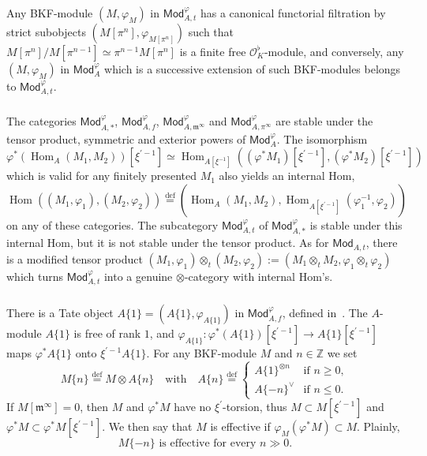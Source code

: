 \documentclass[11pt]{article}
\theoremstyle{definition}
\numberwithin{equation}{section}
\numberwithin{figure}{section}
\numberwithin{table}{section}
\newcommand{\Mod}{\mathsf{Mod}}
\DeclareMathOperator{\Hom}{Hom}
\newcommand{\eqd}{\stackrel{\mathrm{def}}{=}}
\begin{document}
\subsubsection{}

Any BKF-module $(M,\varphi_{M})$ in $\Mod_{A,t}^{\varphi}$ has a canonical functorial filtration by strict subobjects $(M[\pi^{n}],\varphi_{M[\pi^{n}]})$ such that $M[\pi^{n}]/M[\pi^{n-1}]\simeq\pi^{n-1}M[\pi^{n}]$ is a finite free $\mathcal{O}_{K}^{\flat}$-module, and conversely, any $(M,\varphi_{M})$ in $\Mod_{A}^{\varphi}$ which is a successive extension of such BKF-modules belongs to $\Mod_{A,t}^{\varphi}$.

\subsubsection{}

The categories $\Mod_{A,\ast}^{\varphi}$, $\Mod_{A,f}^{\varphi}$, $\Mod_{A,\mathfrak{m}^{\infty}}^{\varphi}$ and $\Mod_{A,\pi^{\infty}}^{\varphi}$ are stable under the tensor product, symmetric and exterior powers of $\Mod_{A}^{\varphi}$. The isomorphism
\[
\varphi^{\ast}\left(\Hom_{A}(M_{1},M_{2})\right)\left[\xi^{\prime-1}\right]\simeq\Hom_{A[\xi^{-1}]}\left(\left(\varphi^{\ast}M_{1}\right)\left[\xi^{\prime-1}\right],\left(\varphi^{\ast}M_{2}\right)\left[\xi^{\prime-1}\right]\right)
\]
which is valid for any finitely presented $M_{1}$ also yields an internal Hom,
\[
\Hom\left(\left(M_{1},\varphi_{1}\right),\left(M_{2},\varphi_{2}\right)\right)\eqd\left(\Hom_{A}(M_{1},M_{2}),\Hom_{A[\xi^{\prime-1}]}\left(\varphi_{1}^{-1},\varphi_{2}\right)\right)
\]
on any of these categories. The subcategory $\Mod_{A,t}^{\varphi}$ of $\Mod_{A,\ast}^{\varphi}$ is stable under this internal Hom, but it is not stable under the tensor product. As for $\Mod_{A,t}$, there is a modified tensor product $(M_{1},\varphi_{1})\otimes_{t}(M_{2},\varphi_{2}):=(M_{1}\otimes_{t}M_{2},\varphi_{1}\otimes_{t}\varphi_{2})$ which turns $\Mod_{A,t}^{\varphi}$ into a genuine $\otimes$-category with internal Hom's.

\subsubsection{}

There is a Tate object $A\{1\}=\left(A\{1\},\varphi_{A\{1\}}\right)$ in $\Mod_{A,f}^{\varphi}$, defined in~\cite[4.24]{BaMoSc16}. The $A$-module $A\{1\}$ is free of rank $1$, and $\varphi_{A\{1\}}:\varphi^{\ast}(A\{1\})[\xi^{\prime-1}]\rightarrow A\{1\}[\xi^{\prime-1}]$ maps $\varphi^{\ast}A\{1\}$ onto $\xi^{\prime-1}A\{1\}$. For any BKF-module $M$ and $n\in\mathbb{Z}$ we set
\[
M\{n\}\eqd M\otimes A\{n\}\quad\text{with}\quad A\{n\}\eqd
\begin{cases}
A\{1\}^{\otimes n} & \text{if }n\geq0,\\
A\{-n\}^{\vee} & \text{if }n\leq0.
\end{cases}
\]
If $M[\mathfrak{m}^{\infty}]=0$, then $M$ and $\varphi^{\ast}M$ have no $\xi^{\prime}$-torsion, thus $M\subset M[\xi^{\prime-1}]$ and $\varphi^{\ast}M\subset\varphi^{\ast}M[\xi^{\prime-1}]$. We then say that $M$ is effective if $\varphi_{M}(\varphi^{\ast}M)\subset M$. Plainly,
\[
M\{-n\}\text{ is effective for every }n\gg0.
\]
\end{document}
